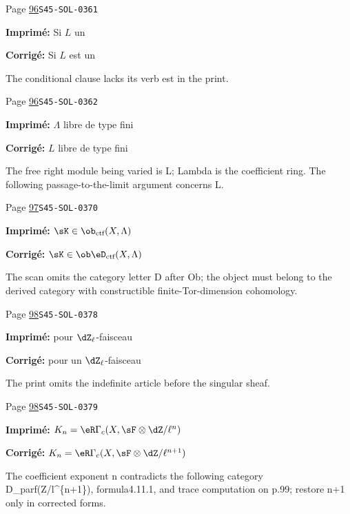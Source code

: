 \begin{description}
\smallskip
\item[\hypertarget{apparatus:FR-0049}{49}] Page \hyperlink{printpage:fr:96}{96}\quad\texttt{S45-SOL-0361}
\par\noindent\textbf{Imprimé:} Si $L$ un
\par\noindent\textbf{Corrigé:} Si $L$ est un
\par\noindent The conditional clause lacks its verb est in the print.
\smallskip
\item[\hypertarget{apparatus:FR-0050}{50}] Page \hyperlink{printpage:fr:96}{96}\quad\texttt{S45-SOL-0362}
\par\noindent\textbf{Imprimé:} $\Lambda$ libre de type fini
\par\noindent\textbf{Corrigé:} $L$ libre de type fini
\par\noindent The free right module being varied is L; Lambda is the coefficient ring. The following passage-to-the-limit argument concerns L.
\smallskip
\item[\hypertarget{apparatus:FR-0051}{51}] Page \hyperlink{printpage:fr:97}{97}\quad\texttt{S45-SOL-0370}
\par\noindent\textbf{Imprimé:} \(\sK\in\ob_{\text{ctf}}(X,\Lambda)\)
\par\noindent\textbf{Corrigé:} \(\sK\in\ob\eD_\text{ctf}(X,\Lambda)\)
\par\noindent The scan omits the category letter D after Ob; the object must belong to the derived category with constructible finite-Tor-dimension cohomology.
\smallskip
\item[\hypertarget{apparatus:FR-0052}{52}] Page \hyperlink{printpage:fr:98}{98}\quad\texttt{S45-SOL-0378}
\par\noindent\textbf{Imprimé:} pour 
$\dZ_\ell$-faisceau
\par\noindent\textbf{Corrigé:} pour un 
$\dZ_\ell$-faisceau
\par\noindent The print omits the indefinite article before the singular sheaf.
\smallskip
\item[\hypertarget{apparatus:FR-0053}{53}] Page \hyperlink{printpage:fr:98}{98}\quad\texttt{S45-SOL-0379}
\par\noindent\textbf{Imprimé:} $K_n=\eR\Gamma_c(X,\sF\otimes\dZ/\ell^n)$
\par\noindent\textbf{Corrigé:} $K_n=\eR\Gamma_c(X,\sF\otimes\dZ/\ell^{n+1})$
\par\noindent The coefficient exponent n contradicts the following category D\_parf(Z/l\textasciicircum{}\{n+1\}), formula4.11.1, and trace computation on p.99; restore n+1 only in corrected forms.

\end{description}
